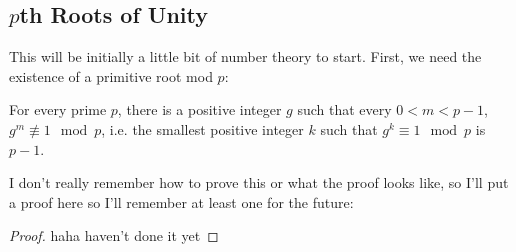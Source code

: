 \documentclass[12pt]{scrartcl}
\begin{document}
\subsection{$p$th Roots of Unity}
This will be initially a little bit of number theory to start. First, we need the existence of a primitive root mod $p$: 
\begin{lemma}
For every prime $p$, there is a positive integer $g$ such that every $0 < m < p-1$, $g^m \not\equiv 1 \mod p$, i.e. the smallest positive integer $k$ such that $g^k \equiv 1 \mod p$ is $p-1$. 
\end{lemma}
I don't really remember how to prove this or what the proof looks like, so I'll put a proof here so I'll remember at least one for the future: 
\begin{proof}
haha haven't done it yet
\end{proof}
\end{document}
